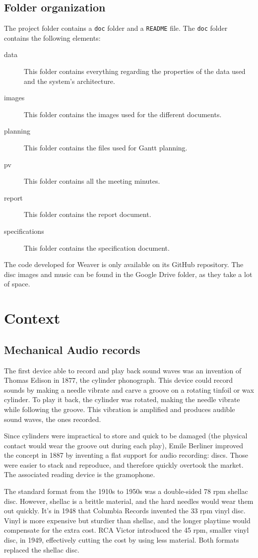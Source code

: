 \documentclass[12pt, twoside]{article}
\begin{document}
\subsection{Folder organization}
The project folder contains a \texttt{doc} folder and a \texttt{README} file. The \texttt{doc} folder contains the following elements:
\begin{description}
	\item[data] This folder contains everything regarding the properties of the data used and the system's architecture.
	\item[images] This folder contains the images used for the different documents.
	\item[planning] This folder contains the files used for Gantt planning.
	\item[pv] This folder contains all the meeting minutes.
	\item[report] This folder contains the report document.
	\item[specifications] This folder contains the specification document.
\end{description}
The code developed for Weaver is only available on its GitHub repository. The disc images and music can be found in the Google Drive folder, as they take a lot of space.
\section{Context}
\subsection{Mechanical Audio records}
The first device able to record and play back sound waves was an invention of Thomas Edison in 1877, the cylinder phonograph\cite{audio}. This device could record sounds by making a needle vibrate and carve a groove on a rotating tinfoil or wax cylinder. To play it back, the cylinder was rotated, making the needle vibrate while following the groove. This vibration is amplified and produces audible sound waves, the ones recorded.

Since cylinders were impractical to store and quick to be damaged (the physical contact would wear the groove out during each play), Emile Berliner improved the concept in 1887 by inventing a flat support for audio recording: discs. Those were easier to stack and reproduce, and therefore quickly overtook the market. The associated reading device is the gramophone.

The standard format from the 1910s to 1950s was a double-sided 78 rpm shellac disc. However, shellac is a brittle material, and the hard needles would wear them out quickly. It's in 1948 that Columbia Records invented the 33 rpm vinyl disc. Vinyl is more expensive but sturdier than shellac, and the longer playtime would compensate for the extra cost. RCA Victor introduced the 45 rpm, smaller vinyl disc, in 1949, effectively cutting the cost by using less material. Both formats replaced the shellac disc.
\end{document}
